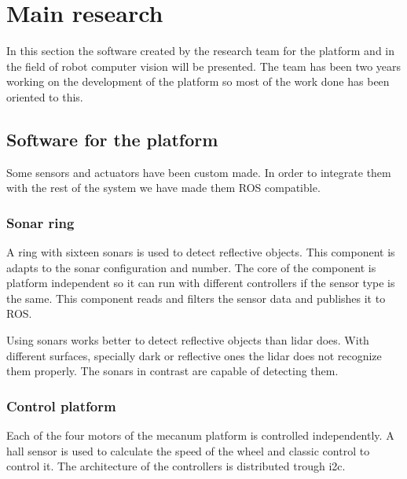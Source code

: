 %
\section{Main research}
In this section the software created by the research team for the platform and in the field of robot computer vision will be presented.
The team has been two years working on the development of the platform so most of the work done has been oriented to this.

\subsection{Software for the platform}
Some sensors and actuators have been custom made.
In order to integrate them with the rest of the system we have made them ROS compatible.
\subsubsection{Sonar ring}
A ring with sixteen sonars is used to detect reflective objects.
This component is adapts to the sonar configuration and number.
The core of the component is platform independent so it can run with different controllers if the sensor type is the same.
This component reads and filters the sensor data and publishes it to ROS.

Using sonars works better to detect reflective objects than lidar does.
With different surfaces, specially dark or reflective ones the lidar does not recognize them properly.
The sonars in contrast are capable of detecting them.

\subsubsection{Control platform}
Each of the four motors of the mecanum platform is controlled independently.
A hall sensor is used to calculate the speed of the wheel and classic control to control it.
The architecture of the controllers is distributed trough i2c.

